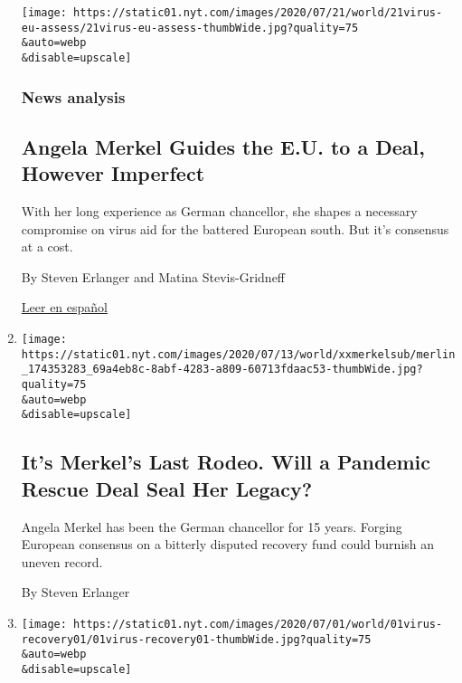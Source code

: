 \begin{enumerate}
  \texttt{[image: https://static01.nyt.com/images/2020/07/21/world/21virus-eu-assess/21virus-eu-assess-thumbWide.jpg?quality=75\\\&auto=webp\\\&disable=upscale]}

  \hypertarget{news-analysis}{%
  \subsubsection{News analysis}\label{news-analysis}}

  \hypertarget{angela-merkel-guides-the-eu-to-a-deal-however-imperfect}{%
  \subsection{Angela Merkel Guides the E.U. to a Deal, However
  Imperfect}\label{angela-merkel-guides-the-eu-to-a-deal-however-imperfect}}

  With her long experience as German chancellor, she shapes a necessary
  compromise on virus aid for the battered European south. But it's
  consensus at a cost.

  By Steven Erlanger and Matina Stevis-Gridneff

  \href{https://www.nytimes.com/es/2020/07/22/espanol/mundo/coronavirus-union-europea-estimulo.html}{Leer
  en español}
\item
  \href{/2020/07/16/world/europe/Merkel-EU-summit-coronavirus-rescue-recovery-plan.html}{}

  \texttt{[image: https://static01.nyt.com/images/2020/07/13/world/xxmerkelsub/merlin\_174353283\_69a4eb8c-8abf-4283-a809-60713fdaac53-thumbWide.jpg?quality=75\\\&auto=webp\\\&disable=upscale]}

  \hypertarget{its-merkels-last-rodeo-will-a-pandemic-rescue-deal-seal-her-legacy}{%
  \subsection{It's Merkel's Last Rodeo. Will a Pandemic Rescue Deal Seal
  Her
  Legacy?}\label{its-merkels-last-rodeo-will-a-pandemic-rescue-deal-seal-her-legacy}}

  Angela Merkel has been the German chancellor for 15 years. Forging
  European consensus on a bitterly disputed recovery fund could burnish
  an uneven record.

  By Steven Erlanger
\item
  \href{/2020/07/01/world/europe/coronavirus-europe-usa.html}{}

  \texttt{[image: https://static01.nyt.com/images/2020/07/01/world/01virus-recovery01/01virus-recovery01-thumbWide.jpg?quality=75\\\&auto=webp\\\&disable=upscale]}


\end{enumerate}
